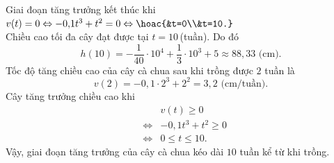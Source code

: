 \begin{ex}
{\begin{itemchoice}
			\itemch Giai đoạn tăng trưởng kết thúc khi $v(t) = 0 \Leftrightarrow -0{,}1t^3 + t^2 = 0 \Leftrightarrow \hoac{&t=0\\&t=10.}$\\
			Chiều cao tối đa cây đạt được tại $t = 10$\,(tuần). Do đó
			\[ h(10) = -\dfrac{1}{40}\cdot 10^4 + \dfrac{1}{3}\cdot 10^3 + 5 \approx 88{,}33 \text{ (cm)}. \]
			\itemch Tốc độ tăng chiều cao của cây cà chua sau khi trồng được $2$ tuần là
			\[v(2) = -0{,}1\cdot 2^3 + 2^2 = 3{,}2 \text{ (cm/tuần)}.\]
			\itemch Cây tăng trưởng chiều cao khi
			\begin{eqnarray*}
				&&v(t) \ge 0\\
				&\Leftrightarrow&-0{,}1t^3 + t^2\ge 0\\
				&\Leftrightarrow& 0\le t\le 10.
			\end{eqnarray*}
			Vậy, giai đoạn tăng trưởng của cây cà chua kéo dài $10$ tuần kể từ khi trồng.
		\end{itemchoice}
	}
\end{ex}

